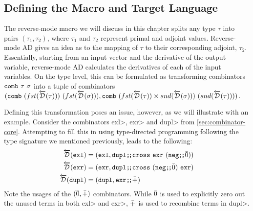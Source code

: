 \subsection{Defining the Macro and Target Language}\label{sec:combinator-macro}
  The reverse-mode macro we will discuss in this chapter splits any type $\tau$ into pairs $(\tau_1, \tau_2)$, where $\tau_1$ and $\tau_2$ represent primal and adjoint values.
  Reverse-mode AD gives an idea as to the mapping of $\tau$ to their corresponding adjoint, $\tau_2$.
  Essentially, starting from an input vector and the derivative of the output variable, reverse-mode AD calculates the derivatives of each of the input variables.
  On the type level, this can be formulated as transforming combinators $\texttt{comb}\ \tau\ \sigma$ into a tuple of combinators $(\texttt{comb}\ (fst(\overleftarrow{\mathcal{D}}(\tau)))\ (fst(\overleftarrow{\mathcal{D}}(\sigma))), \texttt{comb}\ (fst(\overleftarrow{\mathcal{D}}(\tau)) \times snd(\overleftarrow{\mathcal{D}}(\sigma)))\ (snd(\overleftarrow{\mathcal{D}}(\tau))))$.

  Defining this transformation poses an issue, however, as we will illustrate with an example.
  Consider the combinators \<exl>, \<exr> and \<dupl> from \cref{sec:combinator-core}.
  Attempting to fill this in using type-directed programming following the type signature we mentioned previously, leads to the following:
  \begin{align*}
    \overleftarrow{\mathcal{D}}(\texttt{exl}) &= (\texttt{exl}, \texttt{dupl} \texttt{;\!;} \texttt{cross}\ \texttt{exr}\ (\texttt{neg} \texttt{;\!;} \bar{0})) \\
    \overleftarrow{\mathcal{D}}(\texttt{exr}) &= (\texttt{exr}, \texttt{dupl} \texttt{;\!;} \texttt{cross}\ (\texttt{neg} \texttt{;\!;} \bar{0})\ \texttt{exr}) \\
    \overleftarrow{\mathcal{D}}(\texttt{dupl}) &= (\texttt{dupl}, \texttt{exr} \texttt{;\!;} \bar{+})
  \end{align*}
  Note the usages of the $(\bar{0}, \bar{+})$ combinators.
  While $\bar{0}$ is used to explicitly zero out the unused terms in both \<exl> and \<exr>, $\bar{+}$ is used to recombine terms in \<dupl>.

